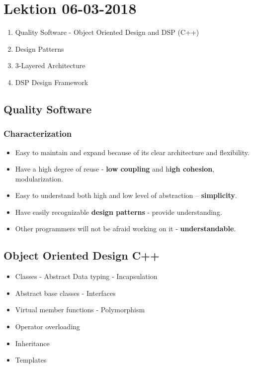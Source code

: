 \section{Lektion 06-03-2018}

\begin{enumerate}
	\item Quality Software - Object Oriented Design and DSP (C++)
	\item Design Patterns
	\item 3-Layered Architecture
	\item DSP Design Framework
\end{enumerate}

\subsection{Quality Software}
\subsubsection{Characterization}
\begin{itemize}
	\item Easy to maintain and expand because of its clear architecture and flexibility.
	\item Have a high degree of reuse - \textbf{low coupling} and h\textbf{igh cohesion}, modularization.
	\item Easy to understand both high and low level of	abstraction – \textbf{simplicity}.
	\item Have easily recognizable \textbf{design patterns} - provide understanding.
	\item Other programmers will not be afraid working on
	it - \textbf{understandable}.
\end{itemize}
\newpage
\subsection{Object Oriented Design C++}
\begin{itemize}
	\item Classes - Abstract Data typing - Incapsulation
	\item Abstract base classes - Interfaces
	\item Virtual member functions - Polymorphism
	\item Operator overloading
	\item Inheritance
	\item Templates
\end{itemize}

